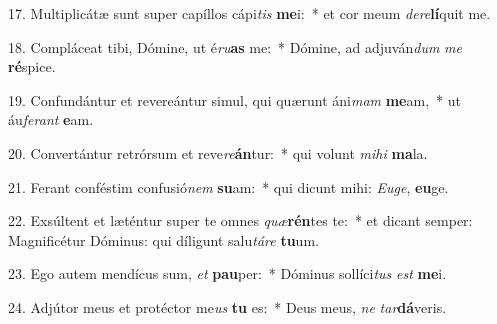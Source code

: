 17. Multiplicátæ sunt super capíllos cápi\textit{tis} \textbf{me}i:~*  et cor meum \textit{de}\textit{re}\textbf{lí}quit me.\

18. Compláceat tibi, Dómine, ut é\textit{ru}\textbf{as} me:~*  Dómine, ad adjuván\textit{dum} \textit{me} \textbf{ré}spice.\

19. Confundántur et revereántur simul, qui quærunt áni\textit{mam} \textbf{me}am,~*  ut áu\textit{fe}\textit{rant} \textbf{e}am.\

20. Convertántur retrórsum et reve\textit{re}\textbf{án}tur:~*  qui volunt \textit{mi}\textit{hi} \textbf{ma}la.\

21. Ferant conféstim confusió\textit{nem} \textbf{su}am:~*  qui dicunt mihi: \textit{Eu}\textit{ge}, \textbf{eu}ge.\

22. Exsúltent et læténtur super te omnes \textit{quæ}\textbf{rén}tes te:~*  et dicant semper: Magnificétur Dóminus: qui díligunt salu\textit{tá}\textit{re} \textbf{tu}um.\

23. Ego autem mendícus sum, \textit{et} \textbf{pau}per:~*  Dóminus sollíci\textit{tus} \textit{est} \textbf{me}i.\

24. Adjútor meus et protéctor me\textit{us} \textbf{tu} es:~*  Deus meus, \textit{ne} \textit{tar}\textbf{dá}veris.\

